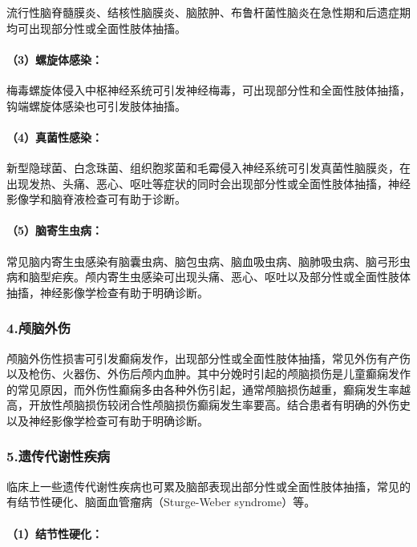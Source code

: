 流行性脑脊髓膜炎、结核性脑膜炎、脑脓肿、布鲁杆菌性脑炎在急性期和后遗症期均可出现部分性或全面性肢体抽搐。

\paragraph{（3）螺旋体感染：}

梅毒螺旋体侵入中枢神经系统可引发神经梅毒，可出现部分性和全面性肢体抽搐，钩端螺旋体感染也可引发肢体抽搐。

\paragraph{（4）真菌性感染：}

新型隐球菌、白念珠菌、组织胞浆菌和毛霉侵入神经系统可引发真菌性脑膜炎，在出现发热、头痛、恶心、呕吐等症状的同时会出现部分性或全面性肢体抽搐，神经影像学和脑脊液检查可有助于诊断。

\paragraph{（5）脑寄生虫病：}

常见脑内寄生虫感染有脑囊虫病、脑包虫病、脑血吸虫病、脑肺吸虫病、脑弓形虫病和脑型疟疾。颅内寄生虫感染可出现头痛、恶心、呕吐以及部分性或全面性肢体抽搐，神经影像学检查有助于明确诊断。

\subsubsection{4.颅脑外伤}

颅脑外伤性损害可引发癫痫发作，出现部分性或全面性肢体抽搐，常见外伤有产伤以及枪伤、火器伤、外伤后颅内血肿。其中分娩时引起的颅脑损伤是儿童癫痫发作的常见原因，而外伤性癫痫多由各种外伤引起，通常颅脑损伤越重，癫痫发生率越高，开放性颅脑损伤较闭合性颅脑损伤癫痫发生率要高。结合患者有明确的外伤史以及神经影像学检查可有助于明确诊断。

\subsubsection{5.遗传代谢性疾病}

临床上一些遗传代谢性疾病也可累及脑部表现出部分性或全面性肢体抽搐，常见的有结节性硬化、脑面血管瘤病（Sturge-Weber
syndrome）等。

\paragraph{（1）结节性硬化：}

